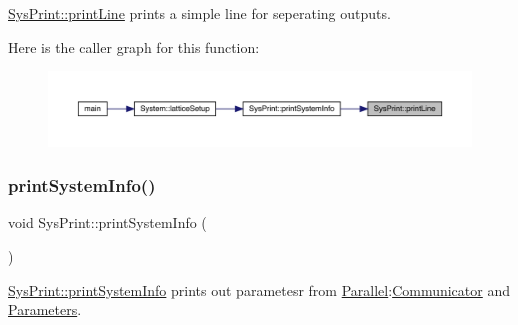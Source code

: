 \mbox{\hyperlink{class_sys_print_abdf8282e73cc002e5e572c6f09266cc9}{Sys\+Print\+::print\+Line}} prints a simple line for seperating outputs. 

Here is the caller graph for this function\+:\nopagebreak
\begin{figure}[H]
\begin{center}
\leavevmode
\includegraphics[width=350pt]{class_sys_print_abdf8282e73cc002e5e572c6f09266cc9_icgraph}
\end{center}
\end{figure}
\mbox{\label{class_sys_print_a4572572643f6f4685081a3ae419e5ca9}} 
\subsubsection{\texorpdfstring{printSystemInfo()}{printSystemInfo()}}
{\footnotesize\ttfamily void Sys\+Print\+::print\+System\+Info (\begin{DoxyParamCaption}{ }\end{DoxyParamCaption})\hspace{0.3cm}{\ttfamily [static]}}



\mbox{\hyperlink{class_sys_print_a4572572643f6f4685081a3ae419e5ca9}{Sys\+Print\+::print\+System\+Info}} prints out parametesr from \mbox{\hyperlink{namespace_parallel}{Parallel}}\+:\mbox{\hyperlink{class_communicator}{Communicator}} and \mbox{\hyperlink{class_parameters}{Parameters}}. 

